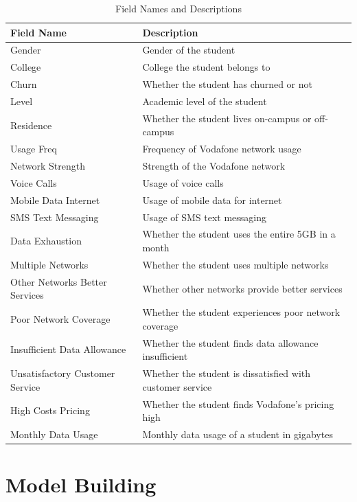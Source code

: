 \documentclass[12pt]{report} %
\begin{document}
\begin{table}[H]
\centering
\begin{tabular}{|>{\raggedright\arraybackslash}p{4cm}|p{9cm}|} \hline  

\textbf{Field Name} & \textbf{Description} \\ \hline  

Gender & Gender of the student \\ \hline  
College & College the student belongs to \\ \hline  
Churn & Whether the student has churned or not \\ \hline  
Level & Academic level of the student \\ \hline  
Residence & Whether the student lives on-campus or off-campus \\ \hline  
Usage Freq& Frequency of Vodafone network usage \\ \hline  
Network Strength& Strength of the Vodafone network \\ \hline  
Voice Calls& Usage of voice calls \\ \hline  
Mobile Data Internet& Usage of mobile data for internet \\ \hline  
SMS Text Messaging& Usage of SMS text messaging \\ \hline  
Data Exhaustion& Whether the student uses the entire 5GB in a month \\ \hline  
Multiple Networks& Whether the student uses multiple networks \\ \hline  
Other Networks Better Services& Whether other networks provide better services \\ \hline  
Poor Network Coverage& Whether the student experiences poor network coverage \\ \hline  
Insufficient Data Allowance& Whether the student finds data allowance insufficient \\ \hline  
Unsatisfactory Customer Service& Whether the student is dissatisfied with customer service \\ \hline  
High Costs Pricing& Whether the student finds Vodafone's pricing high \\ \hline  
Monthly Data Usage& Monthly data usage of a student in gigabytes \\ \hline 

\end{tabular}
\caption{Field Names and Descriptions}
\end{table}


\section{Model Building}
\end{document}
